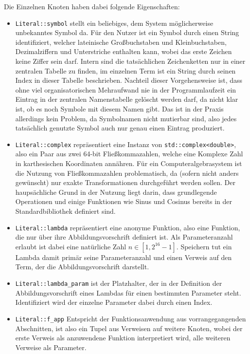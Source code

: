 \documentclass{scrartcl}
\numberwithin{figure}{section} %
\theoremstyle{definition} %
\begin{document}
Die Einzelnen Knoten haben dabei folgende Eigenschaften:
\begin{itemize}
\item \texttt{Literal::symbol} stellt ein beliebiges, dem System möglicherweise unbekanntes Symbol da. Für den Nutzer ist ein Symbol durch einen String identifiziert, welcher lateinische Großbuchstaben und Kleinbuchstaben, Dezimalziffern und Unterstriche enthalten kann, wobei das erste Zeichen keine Ziffer sein darf. Intern sind die tatsächlichen Zeichenketten nur in einer zentralen Tabelle zu finden, im einzelnen Term ist ein String durch seinen Index in dieser Tabelle beschrieben. Nachteil dieser Vorgehensweise ist, dass ohne viel organisatorischen Mehraufwand nie in der Programmlaufzeit ein Eintrag in der zentralen Namenstabelle gelöscht werden darf, da nicht klar ist, ob es noch Symbole mit diesem Namen gibt. Das ist in der Praxis allerdings kein Problem, da Symbolnamen nicht mutierbar sind, also jedes tatsächlich genutzte Symbol auch nur genau einen Eintrag produziert.
\item \texttt{Literal::complex} repräsentiert eine Instanz von \texttt{std::complex<double>}, also ein Paar aus zwei 64-bit Fließkommazahlen, welche eine Komplexe Zahl in karthesischen Koordinaten annähren. Für ein Computeralgebrasystem ist die Nutzung von Fließkommazahlen problematisch, da (sofern nicht anders gewünscht) nur exakte Transformationen durchgeführt werden sollen. Der haupsächliche Grund in der Nutzung liegt darin, dass grundlegende Operationen und einige Funktionen wie Sinus und Cosinus bereits in der Standardbibliothek definiert sind. 
\item \texttt{Literal::lambda} repräsentiert eine anonyme Funktion, also eine Funktion, die nur über ihre Abbildungsvorschrift definiert ist. Als Parameteranzahl erlaubt ist dabei eine natürliche Zahl $n \in [1, 2^{16} - 1]$. Speichern tut ein Lambda damit primär seine Parameteranzahl und einen Verweis auf den Term, der die Abbildungsvorschrift darstellt.
\item \texttt{Literal::lambda_param} ist der Platzhalter, der in der Definition der Abbildungsvorschrift eines Lambdas für einen bestimmten Parameter steht. Identifiziert wird der einzelne Parameter dabei durch einen Index.
\item \texttt{Literal::f_app} Entspricht der Funktionsanwendung aus vorrangegangenden Abschnitten, ist also ein Tupel aus Verweisen auf weitere Knoten, wobei der erste Verweis als anzuwendene Funktion interpretiert wird, alle weiteren Verweise als Parameter.
\end{itemize}
\end{document}

